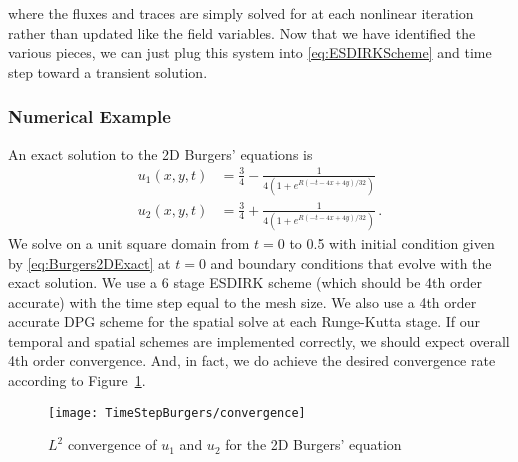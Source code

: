 \documentclass[Proposal.tex]{subfiles}
\begin{document}
where the fluxes and traces are simply solved for at each nonlinear iteration rather than updated like the field variables.
Now that we have identified the various pieces, we can just plug this system into \eqref{eq:ESDIRKScheme} and time step toward a transient solution.

\subsubsection{Numerical Example}
An exact solution to the 2D Burgers' equations is
\begin{equation}
\label{eq:Burgers2DExact}
	\begin{aligned}
	u_1(x,y,t)&=\frac{3}{4}-\frac{1}{4(1+e^{R(-t-4x+4y)/32})}\\
	u_2(x,y,t)&=\frac{3}{4}+\frac{1}{4(1+e^{R(-t-4x+4y)/32})}\,.
	\end{aligned}
\end{equation}
We solve on a unit square domain from $t=0$ to 0.5 with initial condition given by \eqref{eq:Burgers2DExact} at $t=0$ and boundary conditions that evolve with the exact solution. 
We use a 6 stage ESDIRK scheme (which should be 4th order accurate) with the time step equal to the mesh size. 
We also use a 4th order accurate DPG scheme for the spatial solve at each Runge-Kutta stage. 
If our temporal and spatial schemes are implemented correctly, we should expect overall 4th order convergence.
And, in fact, we do achieve the desired convergence rate according to Figure~\ref{fig:Burgers2DConvergence}.

\begin{figure}[!ht]
	\centering
	\texttt{[image: TimeStepBurgers/convergence]}
	\caption{$L^2$ convergence of $u_1$ and $u_2$ for the 2D Burgers' equation}
	\label{fig:Burgers2DConvergence}
\end{figure}
\end{document}

